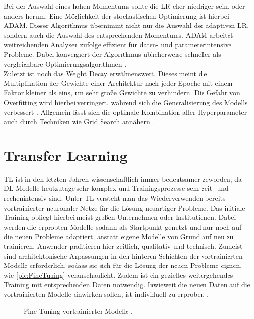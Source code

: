 \noindent
Bei der Auswahl eines hohen Momentums sollte die \ac{LR} eher niedriger sein, oder anders herum. Eine Möglichkeit der stochastischen Optimierung ist hierbei \ac{ADAM}. Dieser Algorithmus übernimmt nicht nur die Auswahl der adaptiven \ac{LR}, sondern auch die Auswahl des entsprechenden Momentums. \ac{ADAM} arbeitet weitreichenden Analysen zufolge effizient für daten- und parameterintensive Probleme. Dabei konvergiert der Algorithmus üblicherweise schneller als vergleichbare Optimierungsalgorithmen \cite[S.~1-2]{KIN17}.\\

\noindent
Zuletzt ist noch das Weight Decay erwähnenswert. Dieses meint die Multiplikation der Gewichte einer Architektur nach jeder Epoche mit einem Faktor kleiner als eins, um sehr große Gewichte zu verhindern. Die Gefahr von Overfitting wird hierbei verringert, während sich die Generalisierung des Modells verbessert \cite[S.~154]{ZHA20}. Allgemein lässt sich die optimale Kombination aller Hyperparameter auch durch Techniken wie Grid Search annähern \cite[S.~24]{YAN20}.


\section{Transfer Learning}
\noindent
\ac{TL} ist in den letzten Jahren wissenschaftlich immer bedeutsamer geworden, da \ac{DL}-Modelle heutzutage sehr komplex und Trainingsprozesse sehr zeit- und rechenintensiv sind. Unter \ac{TL} versteht man das Wiederverwenden bereits vortrainierter neuronaler Netze für die Lösung neuartiger Probleme. Das initiale Training obliegt hierbei meist großen Unternehmen oder Institutionen. Dabei werden die erprobten Modelle sodann als Startpunkt genutzt und nur noch auf die neuen Probleme adaptiert, anstatt eigene Modelle von Grund auf neu zu trainieren. Anwender profitieren hier zeitlich, qualitativ und technisch. Zumeist sind architektonische Anpassungen in den hinteren Schichten der vortrainierten Modelle erforderlich, sodass sie sich für die Lösung der neuen Probleme eignen, wie \autoref{pic:FineTuning} veranschaulicht. Zudem ist ein gezieltes weitergehendes Training mit entsprechenden Daten notwendig. Inwieweit die neuen Daten auf die vortrainierten Modelle einwirken sollen, ist individuell zu erproben \cite[S.~554]{ZHA20}.\\

\begin{figure}[h]
  \centering
  \caption{Fine-Tuning vortrainierter Modelle \cite[S.~555]{ZHA20}.}
  \label{pic:FineTuning}
\end{figure}

